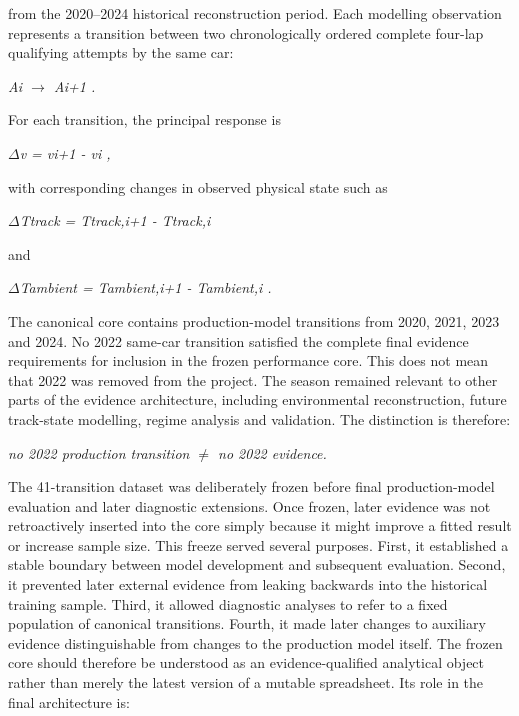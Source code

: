 from the 2020--2024 historical reconstruction period. Each modelling observation represents a transition between two chronologically ordered complete four-lap qualifying attempts by the same car:

\begin{center}\textit{Ai \ensuremath{\rightarrow} Ai+1 .}\end{center}

For each transition, the principal response is

\begin{center}\textit{\ensuremath{\Delta}v = vi+1 - vi ,}\end{center}

with corresponding changes in observed physical state such as

\begin{center}\textit{\ensuremath{\Delta}Ttrack = Ttrack,i+1 - Ttrack,i}\end{center}

and

\begin{center}\textit{\ensuremath{\Delta}Tambient = Tambient,i+1 - Tambient,i .}\end{center}

The canonical core contains production-model transitions from 2020, 2021, 2023 and 2024. No 2022 same-car transition satisfied the complete final evidence requirements for inclusion in the frozen performance core. This does not mean that 2022 was removed from the project. The season remained relevant to other parts of the evidence architecture, including environmental reconstruction, future track-state modelling, regime analysis and validation. The distinction is therefore:

\begin{center}\textit{no 2022 production transition \ensuremath{\neq} no 2022 evidence.}\end{center}

The 41-transition dataset was deliberately frozen before final production-model evaluation and later diagnostic extensions. Once frozen, later evidence was not retroactively inserted into the core simply because it might improve a fitted result or increase sample size. This freeze served several purposes. First, it established a stable boundary between model development and subsequent evaluation. Second, it prevented later external evidence from leaking backwards into the historical training sample. Third, it allowed diagnostic analyses to refer to a fixed population of canonical transitions. Fourth, it made later changes to auxiliary evidence distinguishable from changes to the production model itself. The frozen core should therefore be understood as an evidence-qualified analytical object rather than merely the latest version of a mutable spreadsheet. Its role in the final architecture is:

